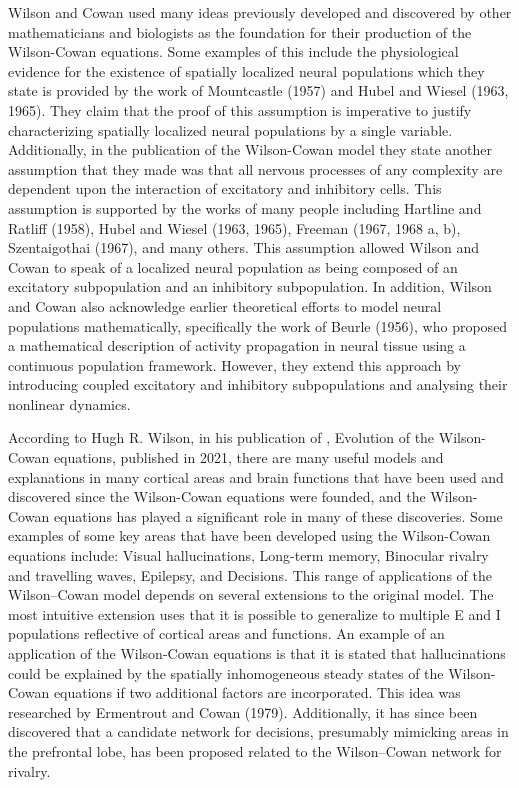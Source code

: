 \documentclass[10pt]{article}
\begin{document}
\begin{flushleft}
    Wilson and Cowan used many ideas previously developed and discovered by other mathematicians and biologists as the foundation for their production of the Wilson-Cowan equations. Some examples of this include the physiological evidence for the existence of spatially localized neural populations which they state is provided by the work of Mountcastle (1957) and Hubel and Wiesel (1963, 1965). They claim that the proof of this assumption is imperative to justify characterizing spatially localized neural populations by a single variable. Additionally, in the publication of the Wilson-Cowan model they state another assumption that they made was that all nervous processes of any complexity are dependent upon the interaction of excitatory and inhibitory cells. This assumption is supported by the works of many people including Hartline and Ratliff (1958), Hubel and Wiesel (1963, 1965), Freeman (1967, 1968 a, b), Szentaigothai (1967), and many others. This assumption allowed Wilson and Cowan to speak of a localized neural population as being composed of an excitatory subpopulation and an inhibitory subpopulation. In addition, Wilson and Cowan also acknowledge earlier theoretical efforts to model neural populations mathematically, specifically the work of Beurle (1956), who proposed a mathematical description of activity propagation in neural tissue using a continuous population framework. However, they extend this approach by introducing coupled excitatory and inhibitory subpopulations and analysing their nonlinear dynamics\cite{PnQ}. 
    \newline

    According to Hugh R. Wilson, in his publication of , Evolution of the Wilson-Cowan equations, published in 2021, there are many useful models and explanations in many cortical areas and brain functions that have been used and discovered since the Wilson-Cowan equations were founded, and the Wilson-Cowan equations has played a significant role in many of these discoveries. Some examples of some key areas that have been developed using the Wilson-Cowan equations include: Visual hallucinations, Long-term memory, Binocular rivalry and travelling waves, Epilepsy, and Decisions. This range of applications of the Wilson–Cowan model depends on several extensions to the original model. The most intuitive extension uses that it is possible to generalize to multiple E and I populations reflective of cortical areas and functions. An example of an application of the Wilson-Cowan equations is that it is stated that hallucinations could be explained by the spatially inhomogeneous steady states of the Wilson-Cowan equations if two additional factors are incorporated. This idea was researched by Ermentrout and Cowan (1979).  Additionally, it has since been discovered that a candidate network for decisions, presumably mimicking areas in the prefrontal lobe, has been proposed related to the Wilson–Cowan network for rivalry\cite{EVO}. 
\end{flushleft}
\end{document}
